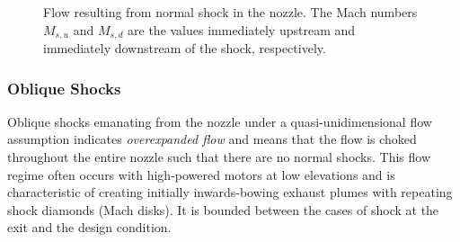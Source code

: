 \documentclass[11pt,dvipsnames]{thesis}
\begin{document}
\begin{figure}[H]
\caption{Flow resulting from normal shock in the nozzle. The Mach numbers $M_{s,u}$ and $M_{s,d}$ are the values immediately upstream and immediately downstream of the shock, respectively.}
\end{figure}

\subsubsection{Oblique Shocks}
Oblique shocks emanating from the nozzle under a quasi-unidimensional flow assumption indicates \textit{overexpanded flow} and means that the flow is choked throughout the entire nozzle such that there are no normal shocks. 
This flow regime often occurs with high-powered motors at low elevations and is characteristic of creating initially inwards-bowing exhaust plumes with repeating shock diamonds (Mach disks).
It is bounded between the cases of shock at the exit and the design condition. 
\end{document}
